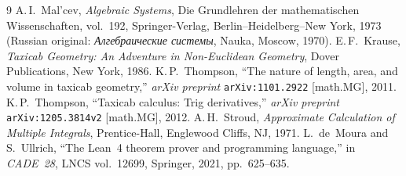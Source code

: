 \documentclass[11pt,a4paper]{article}
\theoremstyle{plain}
\theoremstyle{definition}
\begin{document}
\begin{thebibliography}{9}
A.\,I.~Mal'cev, \emph{Algebraic Systems}, Die Grundlehren der mathematischen Wissenschaften, vol.~192, Springer-Verlag, Berlin--Heidelberg--New York, 1973 (Russian original: \emph{Алгебраические системы}, Nauka, Moscow, 1970).
E.\,F.~Krause, \emph{Taxicab Geometry: An Adventure in Non-Euclidean Geometry}, Dover Publications, New York, 1986.
K.\,P.~Thompson, ``The nature of length, area, and volume in taxicab geometry,'' \emph{arXiv preprint} \texttt{arXiv:1101.2922} [math.MG], 2011.
K.\,P.~Thompson, ``Taxicab calculus: Trig derivatives,'' \emph{arXiv preprint} \texttt{arXiv:1205.3814v2} [math.MG], 2012.
A.\,H.~Stroud, \emph{Approximate Calculation of Multiple Integrals}, Prentice-Hall, Englewood Cliffs, NJ, 1971.
L.~de~Moura and S.~Ullrich, ``The Lean~4 theorem prover and programming language,'' in \emph{CADE~28}, LNCS vol.~12699, Springer, 2021, pp.~625--635.
\end{thebibliography}
\end{document}
